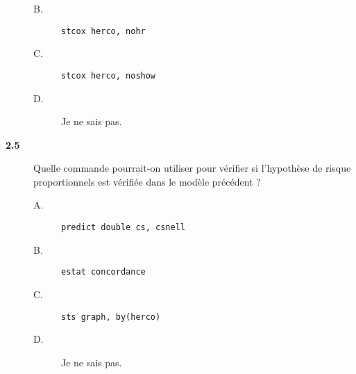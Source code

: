 \begin{description}
\begin{description}
\item[B.] \verb|stcox herco, nohr|
\item[C.] \verb|stcox herco, noshow|
\item[D.] Je ne sais pas.
\end{description}
\item[\bf 2.5] Quelle commande pourrait-on utiliser pour vérifier si
  l'hypothèse de risque proportionnels est vérifiée dans le modèle précédent
  ? 
\begin{description}
\item[A.] \verb|predict double cs, csnell|
\item[B.] \verb|estat concordance|
\item[C.] \verb|sts graph, by(herco)|
\item[D.] Je ne sais pas.
\end{description}
\end{description}
